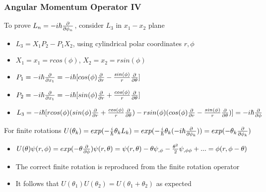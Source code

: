 \documentclass[8pt,t,mathserif,aspectratio=169]{beamer}
\begin{document}
\begin{frame}
  \frametitle{Angular Momentum Operator IV}
  \vspace{1mm}
  To prove $L_n = -i \hbar {\partial \over \partial \phi_n}$, consider $L_3$ in $x_1 - x_2$ plane
  \begin{itemize}
    \item $L_3 = X_1 P_2 - P_1 X_2$, using cylindrical polar coordinates $r,\phi$
    \item $X_1 = x_1 = r cos(\phi)$, $X_2 = x_2 = r sin(\phi)$
    \item $P_1 = -i \hbar {\partial \over \partial x_1} = -i \hbar [cos(\phi) {\partial \over \partial r} - {sin(\phi) \over r} {\partial \over \partial \theta}]$
    \item $P_2 = -i \hbar {\partial \over \partial x_1} = -i \hbar [sin(\phi) {\partial \over \partial r} + {cos(\phi) \over r} {\partial \over \partial \theta}]$
    \item $L_3 = -i \hbar [r cos(\phi) (sin(\phi) {\partial \over \partial r} + {cos(\phi) \over r} {\partial \over \partial \theta}) - r sin(\phi) (cos(\phi) {\partial \over \partial r} - {sin(\phi) \over r} {\partial \over \partial \theta})] = -i \hbar {\partial \over \partial \phi}$
  \end{itemize}
  For finite rotations $U(\theta_k) = exp(-{i \over \hbar} \theta_k L_k) = exp(-{i \over \hbar} \theta_k (-i \hbar {\partial \over \partial \phi_k})) = exp(-\theta_k {\partial \over \partial \phi_k})$
  \begin{itemize}
    \item $U(\theta) \psi(r,\phi) = exp(-\theta {\partial \over \partial \phi}) \psi(r,\theta) = \psi(r,\theta) - \theta \psi_{,\phi} - {\theta^2 \over 2} \psi_{,\phi \phi} + ... = \phi(r,\phi - \theta)$
    \item The correct finite rotation is reproduced from the finite rotation operator
    \item It follows that $U(\theta_1) U(\theta_2) = U(\theta_1 + \theta_2)$ as expected
  \end{itemize}
\end{frame}
\end{document}
